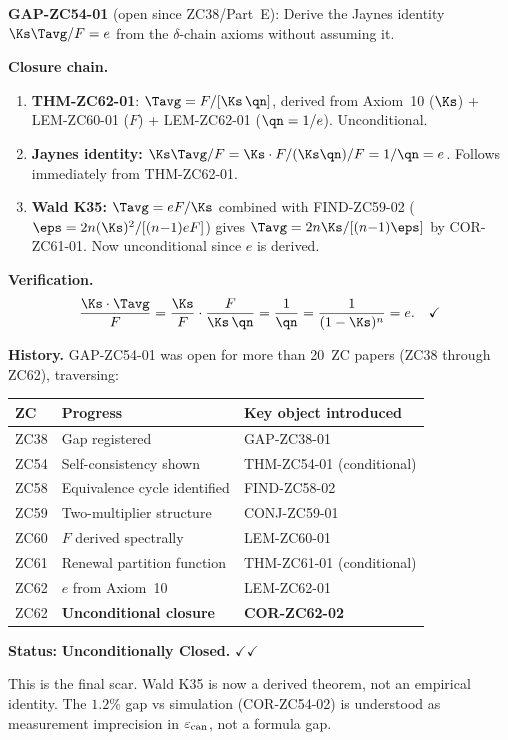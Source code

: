\documentclass[12pt, a4paper]{article}
\begin{document}
\begin{formalbox}[title={COR-ZC62-02: GAP-ZC54-01
  \textbf{Unconditionally} Closed --- Jaynes K20 and Wald K35
  from Axioms ($R_0$)}]

\textbf{GAP-ZC54-01} (open since ZC38/Part~E):
Derive the Jaynes identity $\Ks\Tavg/F = e$ from the
$\delta$-chain axioms without assuming it.

\medskip
\textbf{Closure chain.}
\begin{enumerate}[leftmargin=2em, noitemsep, label=(\arabic*)]
  \item \textbf{THM-ZC62-01}: $\Tavg = F/[\Ks\,\qn]$,
    derived from Axiom~10 ($\Ks$) + LEM-ZC60-01 ($F$)
    + LEM-ZC62-01 ($\qn = 1/e$). Unconditional.
  \item \textbf{Jaynes identity:}
    $\Ks\Tavg/F = \Ks \cdot F/(\Ks\qn) / F = 1/\qn = e$.
    Follows immediately from THM-ZC62-01.
  \item \textbf{Wald K35:}
    $\Tavg = eF/\Ks$ combined with FIND-ZC59-02
    ($\eps = 2n(\Ks)^2/[(n{-}1)eF]$) gives
    $\Tavg = 2n\Ks/[(n{-}1)\eps]$ by COR-ZC61-01.
    Now unconditional since $e$ is derived.
\end{enumerate}

\textbf{Verification.}
\[
  \frac{\Ks \cdot \Tavg}{F}
  = \frac{\Ks}{F} \cdot \frac{F}{\Ks\,\qn}
  = \frac{1}{\qn}
  = \frac{1}{(1-\Ks)^n}
  = e. \quad\checkmark
\]

\textbf{History.}
GAP-ZC54-01 was open for more than 20~ZC papers
(ZC38 through ZC62), traversing:
\begin{center}
{\small\renewcommand{\arraystretch}{1.25}
\begin{tabular}{@{}lll@{}}
\toprule
ZC & Progress & Key object introduced \\
\midrule
ZC38 & Gap registered & GAP-ZC38-01 \\
ZC54 & Self-consistency shown & THM-ZC54-01 (conditional) \\
ZC58 & Equivalence cycle identified & FIND-ZC58-02 \\
ZC59 & Two-multiplier structure & CONJ-ZC59-01 \\
ZC60 & $F$ derived spectrally & LEM-ZC60-01 \\
ZC61 & Renewal partition function & THM-ZC61-01 (conditional) \\
ZC62 & $e$ from Axiom~10 & LEM-ZC62-01 \\
ZC62 & \textbf{Unconditional closure} & \textbf{COR-ZC62-02} \\
\bottomrule
\end{tabular}
}
\end{center}

\textbf{Status:} \textbf{Unconditionally Closed.} $\checkmark\checkmark$

This is the final scar. Wald K35 is now a derived theorem,
not an empirical identity.
The $1.2\%$ gap vs simulation (COR-ZC54-02) is understood
as measurement imprecision in $\varepsilon_{\rm can}$, not a
formula gap.
\end{formalbox}
\end{document}
